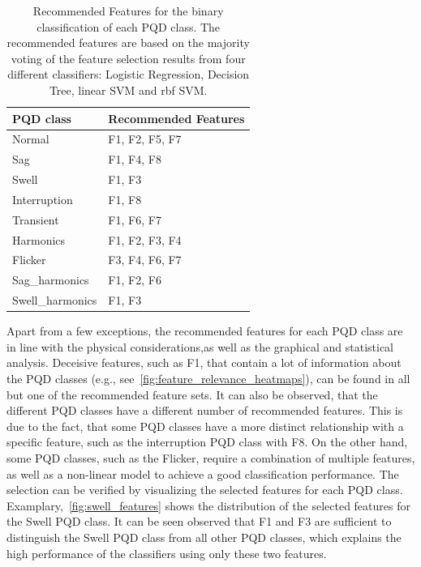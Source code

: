 \begin{table}[htbp]
\caption{Recommended Features for the binary classification of each PQD class. The recommended features are based on the majority voting of the feature selection results from four different classifiers: Logistic Regression, Decision Tree, linear SVM and rbf SVM.}
\label{tab:recommended_features}
\centering
\begin{tabularx}{\columnwidth}{>{\raggedright\arraybackslash}X >{\raggedright\arraybackslash}X}
\hline
\hline
\textbf{PQD class} & \textbf{Recommended Features} \\
\hline
Normal           & F1, F2, F5, F7 \\
Sag              & F1, F4, F8 \\
Swell            & F1, F3 \\
Interruption     & F1, F8 \\
Transient        & F1, F6, F7 \\
Harmonics        & F1, F2, F3, F4 \\
Flicker          & F3, F4, F6, F7 \\
Sag\_harmonics   & F1, F2, F6 \\
Swell\_harmonics & F1, F3 \\
\hline
\hline
\end{tabularx}
\end{table}

Apart from a few exceptions, the recommended features for each PQD class are in line with the physical considerations,as well as the graphical and statistical analysis. Deceisive features, such as F1, that contain a lot of information about the PQD classes (e.g., see~\autoref{fig:feature_relevance_heatmaps}), can be found in all but one of the recommended feature sets. It can also be observed, that the different PQD classes have a different number of recommended features. This is due to the fact, that some PQD classes have a more distinct relationship with a specific feature, such as the interruption PQD class with F8. On the other hand, some PQD classes, such as the Flicker, require a combination of multiple features, as well as a non-linear model to achieve a good classification performance.
The selection can be verified by visualizing the selected features for each PQD class. Examplary,~\autoref{fig:swell_features} shows the distribution of the selected features for the Swell PQD class. It can be seen observed that F1 and F3 are sufficient to distinguish the Swell PQD class from all other PQD classes, which explains the high performance of the classifiers using only these two features.

